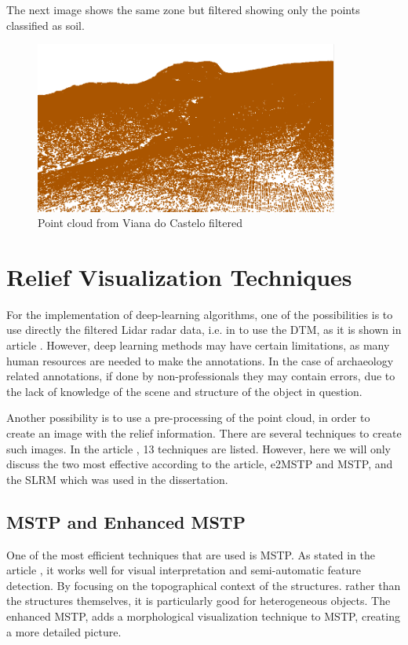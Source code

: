 The next image shows the same zone but filtered showing only the points classified as soil.
\begin{figure}[H]
\centering
\includegraphics[width=10cm]{images/pointcloudVianafiltrado.png}
\caption{Point cloud from Viana do Castelo filtered}
\end{figure}

\section{Relief Visualization Techniques}

For the implementation of deep-learning algorithms, one of the possibilities is to use directly the filtered Lidar radar data, i.e. in to use the DTM, as it is shown in article \cite{deeplearningRawLidarData}. However, deep learning methods may have certain limitations, as many human resources are needed to make the annotations. In the case of archaeology related annotations, if done by non-professionals they may contain errors, due to the lack of knowledge of the scene and structure of the object in question. 

Another possibility is to use a pre-processing of the point cloud, in order to create an image with the relief information. There are several techniques to create such images. In the article \cite{reliefModel}, 13 techniques are listed. However, here we will only discuss the two most effective according to the article, e2MSTP and MSTP, and the SLRM which was used in the dissertation.

\subsection{MSTP and Enhanced MSTP}
One of the most efficient techniques that are used is MSTP. As stated in the article \cite{mstp}, it works well for visual interpretation and semi-automatic feature detection. By focusing on the topographical context of the structures. rather than the structures themselves, it is particularly good for heterogeneous objects. The enhanced MSTP, adds a morphological visualization technique to MSTP, creating a more detailed picture.

